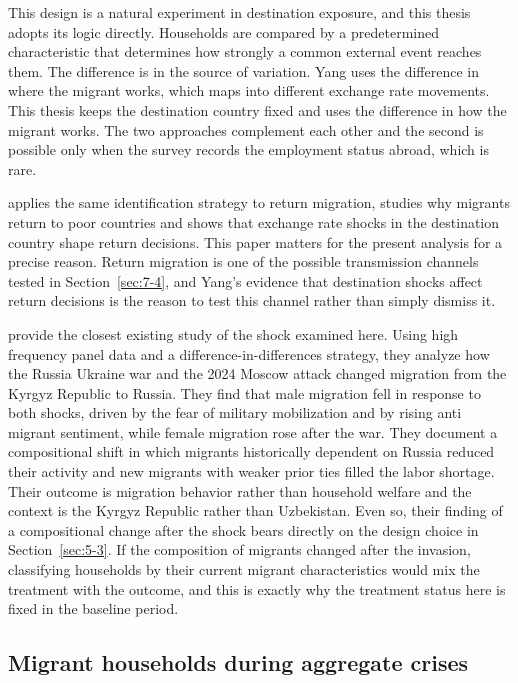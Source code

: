 This design is a natural experiment in destination exposure, and this thesis adopts its logic directly. Households are compared by a predetermined characteristic that determines how strongly a common external event reaches them. The difference is in the source of variation. Yang uses the difference in where the migrant works, which maps into different exchange rate movements. This thesis keeps the destination country fixed and uses the difference in how the migrant works. The two approaches complement each other and the second is possible only when the survey records the employment status abroad, which is rare.

\cite{yang2006} applies the same identification strategy to return migration, studies why migrants return to poor countries and shows that exchange rate shocks in the destination country shape return decisions. This paper matters for the present analysis for a precise reason. Return migration is one of the possible transmission channels tested in Section~\ref{sec:7-4}, and Yang's evidence that destination shocks affect return decisions is the reason to test this channel rather than simply dismiss it.

\cite{bossavie2025} provide the closest existing study of the shock examined here. Using high frequency panel data and a difference-in-differences strategy, they analyze how the Russia Ukraine war and the 2024 Moscow attack changed migration from the Kyrgyz Republic to Russia. They find that male migration fell in response to both shocks, driven by the fear of military mobilization and by rising anti migrant sentiment, while female migration rose after the war. They document a compositional shift in which migrants historically dependent on Russia reduced their activity and new migrants with weaker prior ties filled the labor shortage. Their outcome is migration behavior rather than household welfare and the context is the Kyrgyz Republic rather than Uzbekistan. Even so, their finding of a compositional change after the shock bears directly on the design choice in Section~\ref{sec:5-3}. If the composition of migrants changed after the invasion, classifying households by their current migrant characteristics would mix the treatment with the outcome, and this is exactly why the treatment status here is fixed in the baseline period.

\subsection{Migrant households during aggregate crises}\label{sec:2-3}

